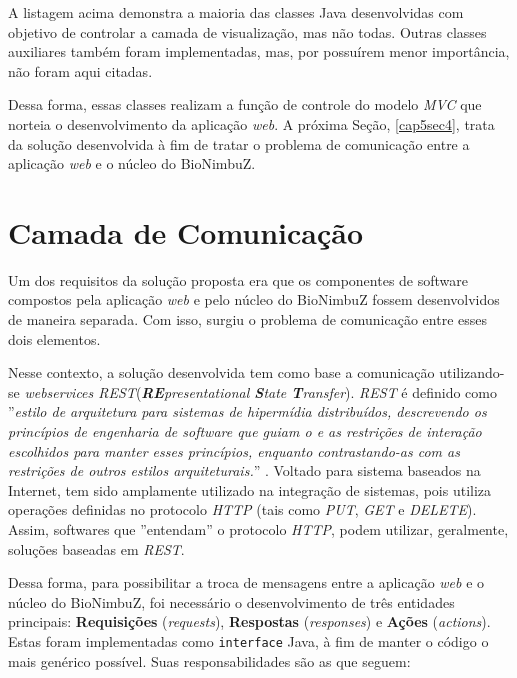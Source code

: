 A listagem acima demonstra a maioria das classes Java desenvolvidas com objetivo de controlar a camada de visualização, mas não todas. Outras classes auxiliares também foram implementadas, mas, por possuírem menor importância, não foram aqui citadas.

Dessa forma, essas classes realizam a função de controle do modelo \textit{MVC} que norteia o desenvolvimento da aplicação \textit{web}. A próxima Seção, \ref{cap5sec4}, trata da solução desenvolvida à fim de tratar o problema de comunicação entre a aplicação \textit{web} e o núcleo do BioNimbuZ.



\section{Camada de Comunicação} \label{cap5sec5}

Um dos requisitos da solução proposta era que os componentes de software compostos pela aplicação \textit{web} e pelo núcleo do BioNimbuZ fossem desenvolvidos de maneira separada. Com isso, surgiu o problema de comunicação entre esses dois elementos.

Nesse contexto, a solução desenvolvida tem como base a comunicação utilizando-se \textit{webservices REST}(\textit{\textbf{RE}presentational \textbf{S}tate \textbf{T}ransfer}). \textit{REST} é definido como ''\textit{estilo de arquitetura para sistemas de hipermídia distribuídos, descrevendo os princípios de engenharia de software que guiam o e as restrições de interação escolhidos para manter esses princípios, enquanto contrastando-as com as restrições de outros estilos arquiteturais.}'' \cite{rest}. Voltado para sistema baseados na Internet, tem sido amplamente utilizado na integração de sistemas, pois utiliza operações definidas no protocolo \textit{HTTP} (tais como \textit{PUT}, \textit{GET} e \textit{DELETE}). Assim, softwares que ''entendam'' o protocolo \textit{HTTP}, podem utilizar, geralmente, soluções baseadas em \textit{REST}.

Dessa forma, para possibilitar a troca de mensagens entre a aplicação \textit{web} e o núcleo do BioNimbuZ, foi necessário o desenvolvimento de três entidades principais: \textbf{Requisições} (\textit{requests}), \textbf{Respostas} (\textit{responses}) e \textbf{Ações} (\textit{actions}). Estas foram implementadas como \texttt{interface} Java, à fim de manter o código o mais genérico possível. Suas responsabilidades são as que seguem:

